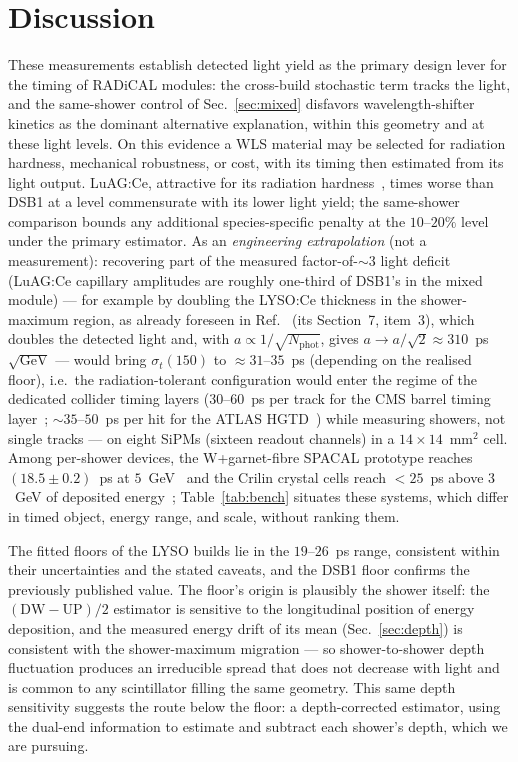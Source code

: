 \documentclass[final,5p,times,twocolumn]{elsarticle}
\begin{document}
\section{Discussion}
\label{sec:discuss}

These measurements establish detected light yield as the primary design lever for the
timing of RADiCAL modules: the cross-build stochastic term tracks the light, and the
same-shower control of Sec.~\ref{sec:mixed} disfavors wavelength-shifter kinetics as
the dominant alternative explanation, within this geometry and at these light levels.
On this evidence a WLS material may be selected for radiation hardness, mechanical
robustness, or cost, with its timing then estimated from its light output. LuAG:Ce,
attractive for its radiation hardness~\cite{luag}, times worse than DSB1 at a level
commensurate with its lower light yield; the same-shower comparison bounds any
additional species-specific penalty at the $10$--$20\%$ level under the primary
estimator. As an \emph{engineering extrapolation} (not a measurement): recovering part
of the measured factor-of-$\sim\!3$ light deficit (LuAG:Ce capillary amplitudes are
roughly one-third of DSB1's in the mixed module) --- for example by doubling the
LYSO:Ce thickness in the shower-maximum region, as already foreseen in
Ref.~\cite{radical} (its Section~7, item~3), which doubles the detected light and, with
$a\propto1/\sqrt{N_{\mathrm{phot}}}$, gives $a\rightarrow
a/\sqrt{2}\approx310$~ps$\sqrt{\mathrm{GeV}}$ --- would bring $\sigma_t(150)$ to $\approx\!31$--$35$~ps
(depending on the realised floor), i.e.\ the radiation-tolerant configuration would
enter the regime of the dedicated collider timing layers
($30$--$60$~ps per track for the CMS barrel timing layer~\cite{cmsmtd};
$\sim\!35$--$50$~ps per hit for the ATLAS HGTD~\cite{hgtd}) while measuring showers,
not single tracks --- on eight SiPMs (sixteen readout channels) in a
$14\times14$~mm$^2$ cell. Among per-shower
devices, the W+garnet-fibre SPACAL prototype reaches $(18.5\pm0.2)$~ps at
$5$~GeV~\cite{spacal} and the Crilin crystal cells reach $<25$~ps above $3$~GeV of
deposited energy~\cite{crilin,cantone2023}; Table~\ref{tab:bench} situates these
systems, which differ in timed object, energy range, and scale, without ranking them.



The fitted floors of the LYSO builds lie in the $19$--$26$~ps range, consistent within
their uncertainties and the stated caveats, and the DSB1 floor confirms the previously
published value. The floor's origin is plausibly the shower itself: the
$(\mathrm{DW}-\mathrm{UP})/2$ estimator is sensitive to the longitudinal position of
energy deposition, and the measured energy drift of its mean (Sec.~\ref{sec:depth}) is
consistent with the shower-maximum migration --- so shower-to-shower depth fluctuation
produces an irreducible spread that does not decrease with light and is common to any
scintillator filling the same geometry. This same depth sensitivity suggests the route
below the floor: a depth-corrected estimator, using the dual-end information to estimate
and subtract each shower's depth, which we are pursuing.
\end{document}
